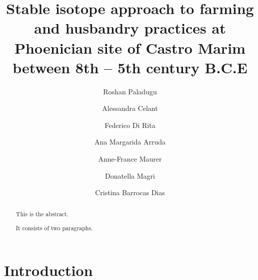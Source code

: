 \documentclass[5p]{elsarticle} %
\begin{document}
\begin{frontmatter}

  \title{Stable isotope approach to farming and husbandry practices at Phoenician site of Castro Marim between 8th -- 5th century B.C.E}
    \author[Universidade de Évora,Laboratório HERCULES]{Roshan Paladugu}
    \author[SAPIENZA Università di Roma]{Alessandra Celant}
    \author[SAPIENZA Università di Roma]{Federico Di Rita}
    \author[Universidade de Lisboa]{Ana Margarida Arruda}
    \author[Laboratório HERCULES]{Anne-France Maurer}
    \author[SAPIENZA Università di Roma]{Donatella Magri}
    \author[Universidade de Évora,Laboratório HERCULES]{Cristina Barrocas Dias}
      \address[Universidade de Évora]{Departamento de Química, Escola de Ciências e Tecnologia, Universidade de Évora, Colégio Luís António Verney, Rua Romão Ramalho 59, Évora, Portugal (7000-671)}
    \address[Laboratório HERCULES]{Laboratório HERCULES, Universidade de Évora, Palácio do Vimioso, Largo Marquês de Marialva 8, 7000-554 Évora, Portugal}
    \address[SAPIENZA Università di Roma]{Dipartimento di Biologia Ambientale, SAPIENZA Università di Roma, Piazzale A. Moro 5, 00185 Roma, Italy}
    \address[Universidade de Lisboa]{Centro de Arqueologia da Universidade de Lisboa, Faculdade de Letras da Universidade de Lisboa, Alameda da Universidade, 1600-214, Lisboa, Portugal}
  
  \begin{abstract}
  This is the abstract.

  It consists of two paragraphs.
  \end{abstract}
  
 \end{frontmatter}

\hypertarget{introduction}{%
\section{Introduction}\label{introduction}}
\end{document}
